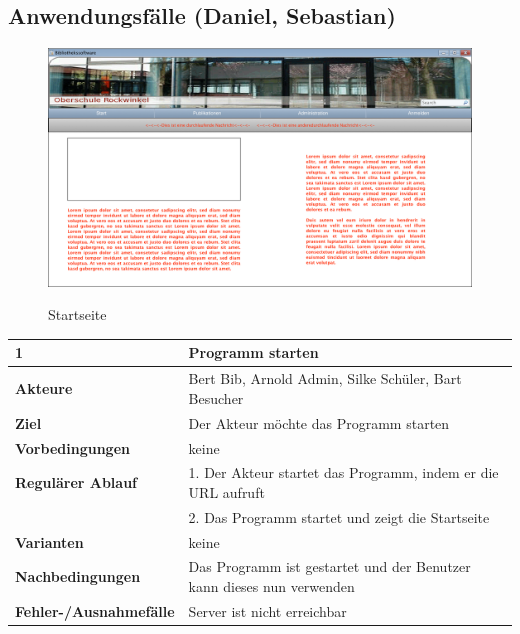 \documentclass[fontsize=12pt,paper=a4,twoside]{scrartcl}
\begin{document}
\subsection{Anwendungsfälle (Daniel, Sebastian)}
\begin{figure}[htbp]
\caption{Startseite}
\includegraphics[width=1\textwidth]{ScreensWebsite/StartseiteLoggedOut.png}
  \label{startseite}
\end{figure}

\begin{table}[htbp]
\label{1}
\begin{tabular}{|l|p{10cm}|}
\hline 
\textbf{1} & \textbf{Programm starten} \\ \hline
\textbf{Akteure} & Bert Bib, Arnold Admin, Silke Schüler, Bart Besucher\\ \hline
\textbf{Ziel} & Der Akteur möchte das Programm starten  \\ \hline
\textbf{Vorbedingungen} & keine \\ \hline
\textbf{Regulärer Ablauf} & 
1. Der Akteur startet das Programm, indem er die URL aufruft \\
&2. Das Programm startet und zeigt die Startseite \\ \hline
\textbf{Varianten} & keine \\ \hline
\textbf{Nachbedingungen} & Das Programm ist gestartet und der Benutzer kann dieses nun verwenden\\ 
\hline
\textbf{Fehler-/Ausnahmefälle} & Server ist nicht erreichbar \\ \hline
\end{tabular}
\end{table}
\end{document}
